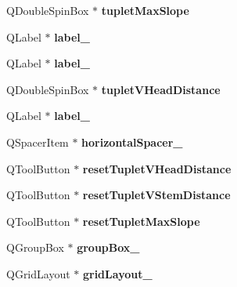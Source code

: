 \begin{DoxyCompactItemize}
Q\+Double\+Spin\+Box $\ast$ {\bfseries tuplet\+Max\+Slope}
\item 
\mbox{\label{class_ui___edit_style_base_a02de19304b4544affcce9422e9363bb3}} 
Q\+Label $\ast$ {\bfseries label\+\_}
\item 
\mbox{\label{class_ui___edit_style_base_a93d8ae5c34902be2046471d5ea87d9aa}} 
Q\+Label $\ast$ {\bfseries label\+\_}
\item 
\mbox{\label{class_ui___edit_style_base_a4a2290bbfeda19107951bcea9d5f72bd}} 
Q\+Double\+Spin\+Box $\ast$ {\bfseries tuplet\+V\+Head\+Distance}
\item 
\mbox{\label{class_ui___edit_style_base_a7d2614e5fe5b050ecf975f8dd7f0d7d8}} 
Q\+Label $\ast$ {\bfseries label\+\_}
\item 
\mbox{\label{class_ui___edit_style_base_a55d0a5e6631c368e87499d1752eceabe}} 
Q\+Spacer\+Item $\ast$ {\bfseries horizontal\+Spacer\+\_}
\item 
\mbox{\label{class_ui___edit_style_base_adc2f1e487bdb705b8f8762b5b43b1820}} 
Q\+Tool\+Button $\ast$ {\bfseries reset\+Tuplet\+V\+Head\+Distance}
\item 
\mbox{\label{class_ui___edit_style_base_a5713e64d7fa145f4d0e14e99af7484fa}} 
Q\+Tool\+Button $\ast$ {\bfseries reset\+Tuplet\+V\+Stem\+Distance}
\item 
\mbox{\label{class_ui___edit_style_base_a8ec964cc1c12200a46ffe1dfc5605bae}} 
Q\+Tool\+Button $\ast$ {\bfseries reset\+Tuplet\+Max\+Slope}
\item 
\mbox{\label{class_ui___edit_style_base_a9ce8cf479f3cb2429e237423e9888300}} 
Q\+Group\+Box $\ast$ {\bfseries group\+Box\+\_}
\item 
\mbox{\label{class_ui___edit_style_base_a8bafdbff9e258f77d6310e53b7691d90}} 
Q\+Grid\+Layout $\ast$ {\bfseries grid\+Layout\+\_}
\item 

\end{DoxyCompactItemize}
